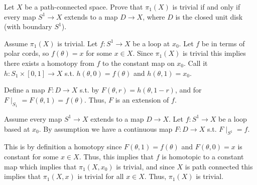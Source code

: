 \documentclass[12pt, letterpaper]{article}
\begin{document}
\begin{problem}{}
    Let $X$ be a path-connected space. Prove that $\pi_1(X)$ is trivial
  if and only if every map $S^1 \to X$ extends to a map $D \to X$,
  where $D$ is the closed unit disk (with boundary $S^1$).
\end{problem}
\begin{problemproof}
    Assume $\pi_1(X)$ is trivial. Let $f : S^1 \to X$ be a loop at $x_0$. Let $f$ be in terms of polar cords, so $f(\theta)=x$ for some $x \in X$. Since $\pi_1(X)$ is trivial this implies there exists a homotopy from $f$ to the constant map on $x_0$. Call it $h : S_1 \times [0,1] \to X$ s.t. $h(\theta,0)=f(\theta)$ and $h(\theta,1)=x_0$.

    Define a map $F : D \to X$ s.t. by $F(\theta, r)=h(\theta, 1-r)$, and for $F \mid_{S_1}=F(\theta,1)=f(\theta)$. Thus, $F$ is an extension of $f$.

    Assume every map $S^1 \to X$ extends to a map $D \to X$. Let $f: S^1 \to X$ be a loop based at $x_0$. By assumption we have a continuous map $F : D \to X$ s.t. $F \mid_{S^1}=f$.

    This is by definition a homotopy since $F(\theta, 1)=f(\theta)$ and $F(\theta,0)=x$ is constant for some $x \in X$. Thus, this implies that $f$ is homotopic to a constant map which implies that $\pi_1(X,x_0)$ is trivial, and since $X$ is path connected this implies that $\pi_1(X,x)$ is trivial for all $x \in X$. Thus, $\pi_1(X)$ is trivial.
\end{problemproof}
\end{document}
